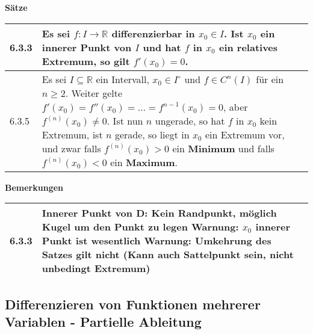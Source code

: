     \noindent 
    \textbf{Sätze}
    \begin{table}[H]
    \begin{tabularx}{\textwidth}{X m{16cm}}
        \toprule

        6.3.3 & Es sei $f: I \rightarrow \mathbb{R}$ differenzierbar in $x_0 \in I$. Ist $x_0$ ein innerer Punkt von $I$ und hat $f$ in $x_0$
                ein relatives Extremum, so gilt $f'(x_0) = 0$. \\
        \midrule
        6.3.5 & Es sei $I \subseteq \mathbb{R}$ ein Intervall, $x_0 \in I^{\circ}$ und $f \in C^n(I)$ für ein $n \geq 2$. Weiter gelte
                $f'(x_0) = f''(x_0) = \dots = f^{n-1}(x_0) = 0$, aber $f^{(n)}(x_0) \neq 0$. Ist nun $n$ ungerade, so hat $f$ in $x_0$ kein
                Extremum, ist $n$ gerade, so liegt in $x_0$ ein Extremum vor, und zwar falls $f^{(n)}(x_0) > 0$ ein \textbf{Minimum} und falls
                $f^{(n)}(x_0) < 0$ ein \textbf{Maximum}. \\

        \bottomrule
    \end{tabularx}
    \end{table}

    \noindent
    \textbf{Bemerkungen}
    \begin{table}[H]
    \begin{tabularx}{\textwidth}{X m{16cm}}
        \toprule

        6.3.3 & Innerer Punkt von D: Kein Randpunkt, möglich Kugel um den Punkt zu legen \hfill \break
                Warnung: $x_0$ innerer Punkt ist wesentlich \hfill \break
                Warnung: Umkehrung des Satzes gilt nicht (Kann auch Sattelpunkt sein, nicht unbedingt Extremum) \\

        \bottomrule
    \end{tabularx}
    \end{table}

\subsection{Differenzieren von Funktionen mehrerer Variablen - Partielle Ableitung}

